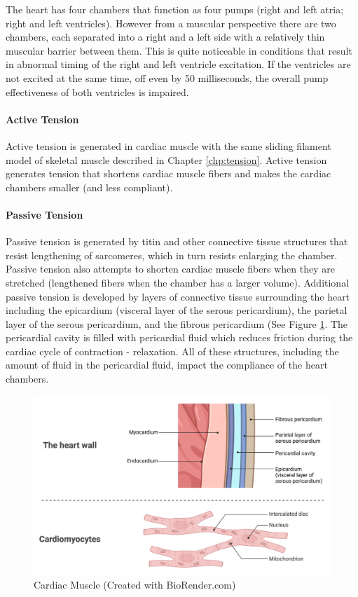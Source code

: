 The heart has four chambers that function as four pumps (right and left atria; right and left ventricles). However from a muscular perspective there are two chambers, each separated into a right and a left side with a relatively thin muscular barrier between them. This is quite noticeable in conditions that result in abnormal timing of the right and left ventricle excitation. If the ventricles are not excited at the same time, off even by 50 milliseconds, the overall pump effectiveness of both ventricles is impaired.

\paragraph{Active Tension}

Active tension is generated in cardiac muscle with the same sliding filament model of skeletal muscle described in Chapter \ref{chp:tension}. Active tension generates tension that shortens cardiac muscle fibers and makes the cardiac chambers smaller (and less compliant). 

\paragraph{Passive Tension}

Passive tension is generated by titin and other connective tissue structures that resist lengthening of sarcomeres, which in turn resists enlarging the chamber. Passive tension also attempts to shorten cardiac muscle fibers when they are stretched (lengthened fibers when the chamber has a larger volume). Additional passive tension is developed by layers of connective tissue surrounding the heart including the epicardium (visceral layer of the serous pericardium), the parietal layer of the serous pericardium, and the fibrous pericardium (See Figure \ref{fig:Cardiac_Muscle}. The pericardial cavity is filled with pericardial fluid which reduces friction during the cardiac cycle of contraction - relaxation. All of these structures, including the amount of fluid in the pericardial fluid, impact the compliance of the heart chambers.

\begin{figure}[!h]
    \centering
    \includegraphics[width=1\linewidth]{./figure/Cardiac_Muscle.png}
    \caption{Cardiac Muscle \footnotesize{(Created with BioRender.com)}}
    \label{fig:Cardiac_Muscle}
\end{figure}

